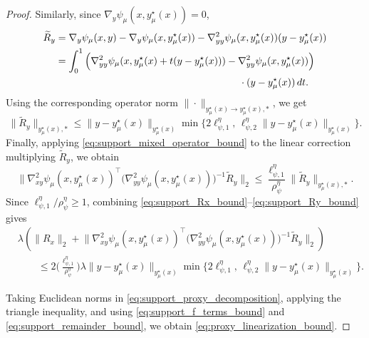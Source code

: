 \documentclass{article}
\begin{document}
\begin{proof}
Similarly, since \(\nabla_y\psi_\mu(x,y_\mu^\star(x))=0\),
\begin{align}
\widetilde R_y
&=
\nabla_y\psi_\mu(x,y)
-
\nabla_y\psi_\mu(x,y_\mu^\star(x))
-
\nabla^2_{yy}\psi_\mu(x,y_\mu^\star(x))(y-y_\mu^\star(x))
\nonumber\\
&=
\int_0^1
\Big(
\nabla^2_{yy}\psi_\mu(x,y_\mu^\star(x)+t(y-y_\mu^\star(x)))
-
\nabla^2_{yy}\psi_\mu(x,y_\mu^\star(x))
\Big)
\nonumber\\
&\hspace{6.5cm}\cdot
(y-y_\mu^\star(x))\,dt .
\label{eq:support_Ry_integral}
\end{align}
Using the corresponding operator norm
\(\|\cdot\|_{y_\mu^\star(x)\to y_\mu^\star(x),*}\), we get
\begin{equation}
\label{eq:support_Ry_inner_bound}
\|\widetilde R_y\|_{y_\mu^\star(x),*}
\le
\|y-y_\mu^\star(x)\|_{y_\mu^\star(x)}
\min\Big\{
2\ell_{\psi,1}^\eta,\,
\ell_{\psi,2}^\eta\|y-y_\mu^\star(x)\|_{y_\mu^\star(x)}
\Big\}.
\end{equation}
Finally, applying \eqref{eq:support_mixed_operator_bound} to the linear correction multiplying
\(\widetilde R_y\), we obtain
\begin{equation}
\label{eq:support_Ry_bound}
\Big\|
\nabla^2_{xy}\psi_\mu(x,y_\mu^\star(x))^\top
\big(\nabla^2_{yy}\psi_\mu(x,y_\mu^\star(x))\big)^{-1}
\widetilde R_y
\Big\|_2
\le
\frac{\ell_{\psi,1}^\eta}{\rho_\psi^\eta}
\|\widetilde R_y\|_{y_\mu^\star(x),*}.
\end{equation}
Since \(\ell_{\psi,1}^\eta/\rho_\psi^\eta\ge1\), combining
\eqref{eq:support_Rx_bound}--\eqref{eq:support_Ry_bound} gives
\begin{align}
&\lambda
\left(
\|R_x\|_2
+
\Big\|
\nabla^2_{xy}\psi_\mu(x,y_\mu^\star(x))^\top
\big(\nabla^2_{yy}\psi_\mu(x,y_\mu^\star(x))\big)^{-1}
\widetilde R_y
\Big\|_2
\right)
\nonumber\\
&\qquad\le
2\Big(\frac{\ell_{\psi,1}^\eta}{\rho_\psi^\eta}\Big)
\lambda
\|y-y_\mu^\star(x)\|_{y_\mu^\star(x)}
\min\Big\{
2\ell_{\psi,1}^\eta,\,
\ell_{\psi,2}^\eta\|y-y_\mu^\star(x)\|_{y_\mu^\star(x)}
\Big\}.
\label{eq:support_remainder_bound}
\end{align}

Taking Euclidean norms in \eqref{eq:support_proxy_decomposition}, applying the triangle inequality,
and using \eqref{eq:support_f_terms_bound} and \eqref{eq:support_remainder_bound}, we obtain
\eqref{eq:proxy_linearization_bound}.
\end{proof}
\end{document}
